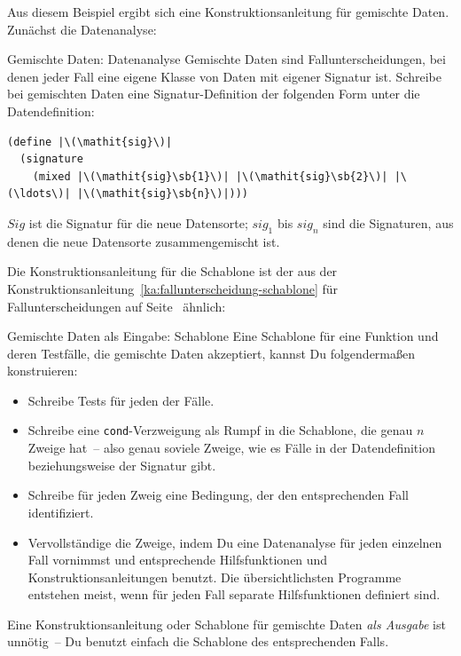 Aus diesem Beispiel ergibt sich eine Konstruktionsanleitung für
gemischte Daten.  Zunächst die Datenanalyse:

\begin{konstruktionsanleitung}{Gemischte Daten: Datenanalyse}
  \label{ka:gemischt-datenanalyse}
  Gemischte Daten sind Fallunterscheidungen, bei denen jeder Fall eine
  eigene Klasse von Daten mit eigener Signatur ist.
  Schreibe bei gemischten Daten eine Signatur-Definition der folgenden Form unter die
  Datendefinition:
%
\begin{lstlisting}
(define |\(\mathit{sig}\)|
  (signature
    (mixed |\(\mathit{sig}\sb{1}\)| |\(\mathit{sig}\sb{2}\)| |\(\ldots\)| |\(\mathit{sig}\sb{n}\)|)))
\end{lstlisting}
$\mathit{Sig}$ ist die Signatur für die neue Datensorte; $\mathit{sig}_1$ bis $\textit{sig}_n$
sind die Signaturen, aus denen die neue
Datensorte zusammengemischt ist.
\end{konstruktionsanleitung}
%
\noindent Die Konstruktionsanleitung für die Schablone ist der aus
der Konstruktionsanleitung~\ref{ka:fallunterscheidung-schablone} für
Fallunterscheidungen auf
Seite~\pageref{ka:fallunterscheidung-schablone} ähnlich:
%
\begin{konstruktionsanleitung}{Gemischte Daten als Eingabe:
    Schablone}
  \label{ka:gemischt-eingabe-schablone}
Eine Schablone für eine Funktion und deren Testfälle, die gemischte
Daten akzeptiert, kannst Du folgendermaßen konstruieren:
%
\begin{itemize}
\item Schreibe Tests für jeden der Fälle.
\item  Schreibe eine \lstinline{cond}-Verzweigung als Rumpf in die
  Schablone, die genau $n$ Zweige hat~-- also genau soviele Zweige,
  wie es Fälle in der Datendefinition beziehungsweise der Signatur gibt.
\item Schreibe für jeden Zweig eine Bedingung, der den entsprechenden
  Fall identifiziert.
\item Vervollständige die Zweige, indem Du eine Datenanalyse für
  jeden einzelnen Fall vornimmst und entsprechende Hilfsfunktionen
  und Konstruktionsanleitungen benutzt.
  Die übersichtlichsten Programme entstehen meist, wenn für jeden Fall
  separate Hilfsfunktionen definiert sind.\label{page:separate-mixed-procs}
\end{itemize}
%
\end{konstruktionsanleitung}
%
Eine Konstruktionsanleitung oder Schablone für gemischte Daten
\emph{als Ausgabe} ist unnötig~-- Du benutzt einfach die Schablone
des entsprechenden Falls.

